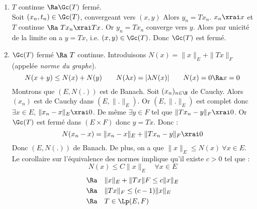 \prvv
\begin{enumerate}
  \item $T$ continue $\Ra\Gc(T)$ fermé.
    \\ Soit $(x_n,t_n)\in\Gc(T)$, convergeant vers $(x,y)$ Alors $y_n=T x_n$. $x_n\xrai x$ et $T$ continue $\Ra\ Tx_n\xrai Tx$. Or $y_n=Tx_n$ converge vers $y$. Alors par unicité de la limite on a $y=Tx$, i.e. $(x,y)\in\Gc(T)$. Donc $\Gc(T)$ est fermé.
  \item $\Gc(T)$ fermé $\Ra\ T$ continue.
    \dl Introduisons $N(x)=\|x\|_E+\|Tx\|_F$ (appelée \emph{norme du graphe}).
    $$N(x+y)\le N(x)+N(y)\quad\quad N(\lambda x)=|\lambda N(x)|\quad\quad N(x)=0\Ra x=0$$
    Montrons que $(E,N(.))$ est de Banach. Soit $(x_n)_{n\in\N}$ de Cauchy. Alors $(x_n)$ est de Cauchy dans $(E,\|.\|_E)$. Or $(E,\|.\|_E)$ est complet donc $\exists x\in E$, $\|x_n-x\|_E\xrai 0$. De même $\exists y\in F$ tel que $\|T x_n-y\|_F\xrai 0$. Or $\Gc(T)$ est fermé dans $(E\times F)$ donc $y=Tx$. Donc :
    $$N(x_n-x)=\|x_n-x\|_E+\|Tx_n-y\|_F\xrai 0$$
  Donc $(E,N(.))$ de Banach.
    \dl De plus, on a que $\|x\|_E\le N(x)\ \forall x\in E$. Le corollaire sur l'équivalence des normes implique qu'il existe $c>0$ tel que :
    $$N(x)\le C\|x\|_E\quad\forall x\in E$$
    \begin{align*}
      \Ra\quad &\|x\|_E+\|Tx\|F\le c\|x\|_E\\
      \Ra\quad &\|Tx\|_F\le(c-1)\|x\|_E\\
      \Ra\quad &T\in\Lp(E,F)
    \end{align*}
\end{enumerate}
\prvf


